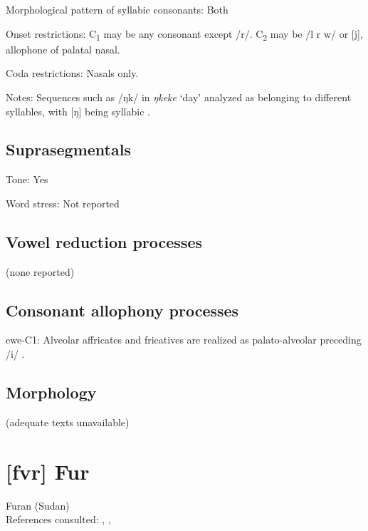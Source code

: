 {\begin{appendixdesc}
\item[Morphological pattern of syllabic consonants:] Both

\item[Onset restrictions:] C\textsubscript{1} may be any consonant except /r/. C\textsubscript{2} may be /l r w/ or [j], allophone of palatal nasal.

\item[Coda restrictions:] Nasals only.

\item[Notes:] Sequences such as /ŋk/ in \textit{ŋkeke} ‘day’ analyzed as belonging to different syllables, with [ŋ] being syllabic \citep[39]{Ameka1991}.
\end{appendixdesc}
\subsection*{Suprasegmentals}
\begin{appendixdesc}
\item[Tone:] Yes

\item[Word stress:] Not reported
\end{appendixdesc}
\subsection*{Vowel reduction processes}

(none reported)

\subsection*{Consonant allophony processes}
\begin{appendixdesc}

\item[ewe-C1:] Alveolar affricates and fricatives are realized as palato-alveolar preceding /i/ \citep[9]{Jalloh2005}.
\end{appendixdesc}
\subsection*{Morphology}

(adequate texts unavailable)
\section*{[fvr] Fur}  %
Furan (Sudan)\medskip\\
References consulted: \citet{Jakobi1990},  \citet{KutschLojengaWaag2004}, \citet{Noel2008}

}
